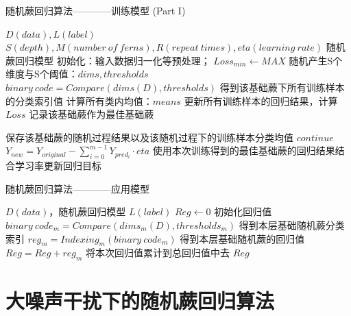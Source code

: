 \begin{algorithm}
\caption{随机蕨回归算法————训练模型 (Part I)}
\begin{algorithmic}[1]
\Require $D(data), L(label)$
\Require $S(depth), M(number\ of\ ferns), R(repeat\ times), eta(learning\ rate)$
\Ensure 随机蕨回归模型
\State 初始化：输入数据归一化等预处理；
	\State $Loss_{min}\leftarrow MAX$
		\State 随机产生S个维度与S个阈值：$dims, thresholds$
		\State $binary\ code=Compare(dims(D), thresholds)$
		\State \Comment 得到该基础蕨下所有训练样本的分类索引值
		\State 计算所有类内均值：$means$
		\State 更新所有训练样本的回归结果，计算$Loss$
			\State 记录该基础蕨作为最佳基础蕨

			\State 保存该基础蕨的随机过程结果以及该随机过程下的训练样本分类均值
		\Else 
			\State $continue$
		\EndIf
	\EndFor
	\State $Y_{new}=Y_{original}-\sum_{i=0}^{m-1} Y_{pred_i}\cdot eta$
	\State \Comment 使用本次训练得到的最佳基础蕨的回归结果结合学习率更新回归目标
\EndFor
\end{algorithmic}
\end{algorithm}


\begin{algorithm}
\caption{随机蕨回归算法————应用模型}
\begin{algorithmic}[1]
\Require $D(data)$，随机蕨回归模型
\Ensure $L(label)$
\State $Reg\leftarrow 0$
\Comment 初始化回归值
	\State $binary\ code_m=Compare(dims_m(D), thresholds_m)$
	\Comment 得到本层基础随机蕨分类索引
	\State $reg_m=Indexing_m(binary\ code_m)$
	\Comment 得到本层基础随机蕨的回归值
	\State $Reg=Reg+reg_m$
	\Comment 将本次回归值累计到总回归值中去
\EndFor
\State \Return $Reg$
\end{algorithmic}
\end{algorithm}



\section{大噪声干扰下的随机蕨回归算法}

